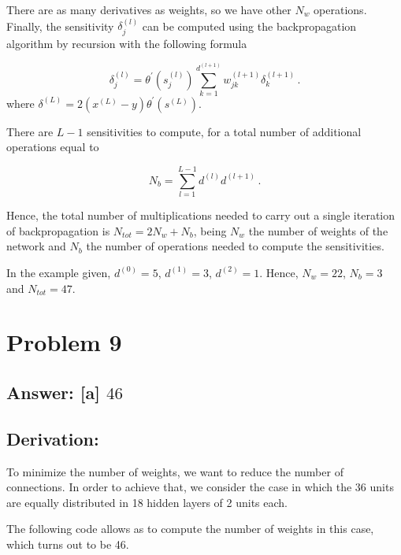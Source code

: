 \documentclass[11pt]{article}
\begin{document}
There are as many derivatives as weights, so we have other \(N_w\)
operations. Finally, the sensitivity \(\delta^{(l)}_j\) can be computed
using the backpropagation algorithm by recursion with the following
formula

\begin{equation}
\delta^{(l)}_j=\theta^\prime(s^{(l)}_j)\sum_{k=1}^{d^{(l+1)}} w_{jk}^{(l+1)}\delta^{(l+1)}_k\,.
\end{equation} where
\(\delta^{(L)}=2(x^{(L)}-y)\theta^\prime(s^{(L)})\).

There are \(L-1\) sensitivities to compute, for a total number of
additional operations equal to

\begin{equation}
N_b=\sum_{l=1}^{L-1} d^{(l)}d^{(l+1)}\,.
\end{equation}

Hence, the total number of multiplications needed to carry out a single
iteration of backpropagation is \(N_{tot}=2N_w+N_b\), being \(N_w\) the
number of weights of the network and \(N_b\) the number of operations
needed to compute the sensitivities.

In the example given, \(d^{(0)}=5\), \(d^{(1)}=3\), \(d^{(2)}=1\).
Hence, \(N_w=22\), \(N_b=3\) and \(N_{tot}=47\).

    \hypertarget{problem-9}{%
\section{Problem 9}\label{problem-9}}

\hypertarget{answer-a-46}{%
\subsection{\texorpdfstring{Answer: {[}a{]}
\(46\)}{Answer: {[}a{]} 46}}\label{answer-a-46}}

\hypertarget{derivation}{%
\subsection{Derivation:}\label{derivation}}

To minimize the number of weights, we want to reduce the number of
connections. In order to achieve that, we consider the case in which the
36 units are equally distributed in 18 hidden layers of 2 units each.

The following code allows as to compute the number of weights in this
case, which turns out to be 46.
\end{document}
